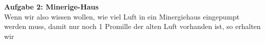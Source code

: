 \textbf{Aufgabe 2: Minerige-Haus}\\
Wenn wir also wissen wollen, wie viel Luft in ein Minergiehaus
eingepumpt werden muss, damit nur noch 1 Promille der alten Luft
vorhanden ist, so erhalten wir


\newpage
